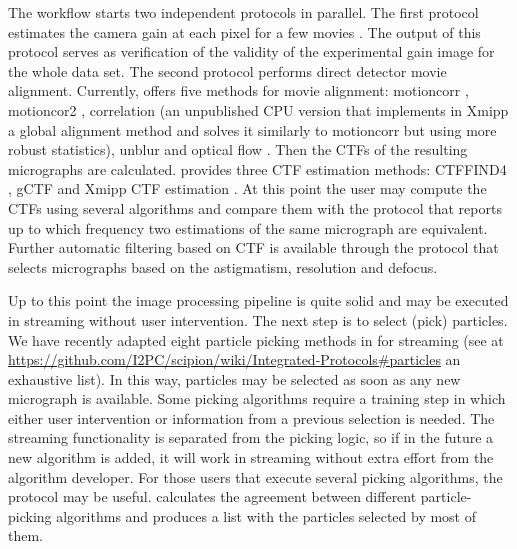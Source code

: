 The workflow starts two independent protocols in parallel. The first protocol estimates the camera gain at each pixel for a few  movies \citep{sorzano2018}. %
The output of this protocol serves as verification of the validity of the experimental gain image for the whole data set. The second protocol performs direct detector movie alignment. Currently, \scipion offers  five  methods for movie alignment: motioncorr \citep{Li2015}, motioncor2 \citep{Zheng2016:motioncor2}, correlation (an unpublished CPU version that implements in Xmipp a global alignment method and solves it similarly to motioncorr but using more robust statistics), unblur \citep{Grant2015:unblur} and optical flow \citep{Abrishami2015:optical-flow}. Then the CTFs of the resulting micrographs are calculated. \scipion provides three CTF estimation methods:
CTFFIND4 \citep{Rohou2015}, gCTF \citep{Zhang2016} and Xmipp CTF estimation \citep{sorzano2007, Vargas2013}. At this point the user may compute the CTFs using several algorithms and compare them with the protocol  that reports up to which frequency two estimations of the same micrograph are equivalent. Further automatic filtering based on CTF is available through the protocol  that selects micrographs based on the astigmatism, resolution and defocus. %

Up to this point the image processing pipeline is quite solid and may be executed in streaming without user intervention. The next step is to select (pick) particles. We have recently adapted eight particle picking methods in \scipion  for streaming (see at \url{https://github.com/I2PC/scipion/wiki/Integrated-Protocols#particles} an exhaustive list). In this way,  particles may be selected as soon as any new micrograph is available. Some picking algorithms require a training step in which either user intervention or information from a previous selection is needed. The streaming functionality is separated from the picking logic, so if in the future a new algorithm is added, it will work in streaming without extra effort from the algorithm developer. For those users that execute several picking algorithms, the protocol  may be useful.   calculates the agreement between different particle-picking algorithms and produces a list with the particles selected by most of them.


